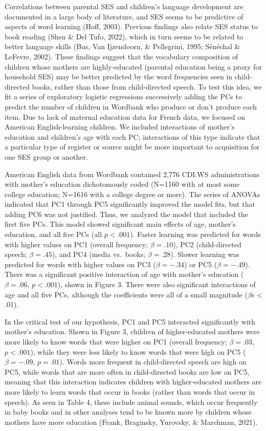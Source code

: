 \documentclass[10pt, letterpaper]{article}
\begin{document}
Correlations between parental SES and children's language development
are documented in a large body of literature, and SES seems to be
predictive of aspects of word learning (Hoff, 2003). Previous findings
also relate SES status to book reading (Shen \& Del Tufo, 2022), which
in turn seems to be related to better language skills (Bus, Van
Ijzendoorn, \& Pellegrini, 1995; Sénéchal \& LeFevre, 2002). These
findings suggest that the vocabulary composition of children whose
mothers are highly-educated (parental education being a proxy for
household SES) may be better predicted by the word frequencies seen in
child-directed books, rather than those from child-directed speech. To
test this idea, we fit a series of exploratory logistic regressions
successively adding the PCs to predict the number of children in
Wordbank who produce or don't produce each item. Due to lack of maternal
education data for French data, we focused on American English-learning
children. We included interactions of mother's education and children's
age with each PC; interactions of this type indicate that a particular
type of register or source might be more important to acquisition for
one SES group or another.

American English data from Wordbank contained 2,776 CDI:WS
administrations with mother's education dichotomously coded (N=1160 with
at most some college education; N=1616 with a college degree or more).
The series of ANOVAs indicated that PC1 through PC5 significantly
improved the model fits, but that adding PC6 was not justified. Thus, we
analyzed the model that included the first five PCs. This model showed
significant main effects of age, mother's education, and all five PCs
(all \(p<.001\)). Faster learning was predicted for words with higher
values on PC1 (overall frequency; \(\beta=.10\)), PC2 (child-directed
speech; \(\beta=.45\)), and PC4 (media vs.~books; \(\beta=.28\)). Slower
learning was predicted for words with higher values on PC3
(\(\beta=-.34\)) or PC5 (\(\beta=-.49\)). There was a significant
positive interaction of age with mother's education (\(\beta=.06\),
\(p<.001\)), shown in Figure 3. There were also significant interactions
of age and all five PCs, although the coefficients were all of a small
magnitude (\(\beta\)s \textless{} .01).

In the critical test of our hypothesis, PC1 and PC5 interacted
significantly with mother's education. Shown in Figure 3, children of
higher-educated mothers were more likely to know words that were higher
on PC1 (overall frequency; \(\beta = .03\), \(p<.001\)), while they were
less likely to know words that were high on PC5 (\(\beta = -.09\),
\(p=.01\)). Words more frequent in child-directed speech are high on
PC5, while words that are more often in child-directed books are low on
PC5, meaning that this interaction indicates children with
higher-educated mothers are more likely to learn words that occur in
books (rather than words that occur in speech). As seen in Table 4,
these include animal sounds, which occur frequently in baby books and in
other analyses tend to be known more by children whose mothers have more
education (Frank, Braginsky, Yurovsky, \& Marchman, 2021).
\end{document}
